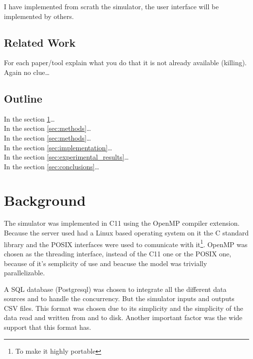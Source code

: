 \documentclass[draft]{article}
\begin{document}
I have implemented from scrath the simulator, the user interface will be
implemented by others.

\subsection{Related Work}\label{sec:related_work}

For each paper/tool explain what you do that it is not already available
(killing). Again no clue\dots

\subsection{Outline}\label{sec:outline}

In the section \ref{sec:background}\dots\\
In the section \ref{sec:methods}\dots\\
In the section \ref{sec:methods}\dots\\
In the section \ref{sec:implementation}\dots\\
In the section \ref{sec:experimental_results}\dots\\
In the section \ref{sec:conclusions}\dots\\

\section{Background}\label{sec:background}

The simulator was implemented in C11 using the OpenMP compiler extension.
Because the server used had a Linux based operating system on it the C standard
library and the POSIX interfaces were used to comunicate with it\footnote{To
make it highly portable}. OpenMP was chosen as the threading interface, instead
of the C11 one or the POSIX one, because of it's semplicity of use and beacuse
the model was trivially parallelizable.

A SQL database (Postgresql) was chosen to integrate all the different data
sources and to handle the concurrency. But the simulator inputs and outputs CSV
files. This format was chosen due to its simplicity and the simplicity of the
data read and written from and to disk. Another important factor was the wide
support that this format has.
\end{document}
